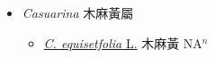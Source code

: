 
  \begin{itemize}
 \item[] \textit{Casuarina} 木麻黃屬
                    
  \begin{itemize}
        \item[] \href{http://www.theplantlist.org/tpl1.1/search?q=Casuarina+equisetfolia}{\textit{C. equisetfolia} L.}   木麻黃 NA$^n$
  \end{itemize}
  \end{itemize}
